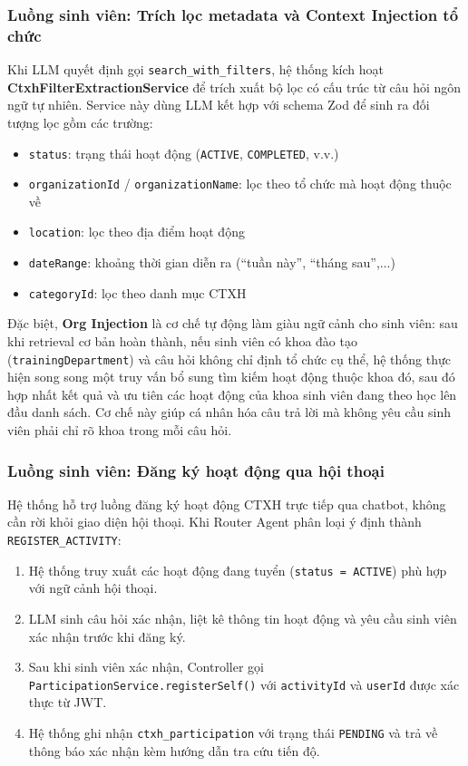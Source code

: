 \subsubsection{Luồng sinh viên: Trích lọc metadata và Context Injection tổ chức}
Khi LLM quyết định gọi \texttt{search\_with\_filters}, hệ thống kích hoạt \textbf{CtxhFilterExtractionService} để trích xuất bộ lọc có cấu trúc từ câu hỏi ngôn ngữ tự nhiên. Service này dùng LLM kết hợp với schema Zod để sinh ra đối tượng lọc gồm các trường:
\begin{itemize}
	\item \texttt{status}: trạng thái hoạt động (\texttt{ACTIVE}, \texttt{COMPLETED}, v.v.)
	\item \texttt{organizationId} / \texttt{organizationName}: lọc theo tổ chức mà hoạt động thuộc về
	\item \texttt{location}: lọc theo địa điểm hoạt động
	\item \texttt{dateRange}: khoảng thời gian diễn ra (``tuần này'', ``tháng sau'',...)
	\item \texttt{categoryId}: lọc theo danh mục CTXH
\end{itemize}

Đặc biệt, \textbf{Org Injection} là cơ chế tự động làm giàu ngữ cảnh cho sinh viên: sau khi retrieval cơ bản hoàn thành, nếu sinh viên có khoa đào tạo (\texttt{trainingDepartment}) và câu hỏi không chỉ định tổ chức cụ thể, hệ thống thực hiện song song một truy vấn bổ sung tìm kiếm hoạt động thuộc khoa đó, sau đó hợp nhất kết quả và ưu tiên các hoạt động của khoa sinh viên đang theo học lên đầu danh sách. Cơ chế này giúp cá nhân hóa câu trả lời mà không yêu cầu sinh viên phải chỉ rõ khoa trong mỗi câu hỏi.

\subsubsection{Luồng sinh viên: Đăng ký hoạt động qua hội thoại}
Hệ thống hỗ trợ luồng đăng ký hoạt động CTXH trực tiếp qua chatbot, không cần rời khỏi giao diện hội thoại. Khi Router Agent phân loại ý định thành \texttt{REGISTER\_ACTIVITY}:

\begin{enumerate}
	\item Hệ thống truy xuất các hoạt động đang tuyển (\texttt{status = ACTIVE}) phù hợp với ngữ cảnh hội thoại.
	\item LLM sinh câu hỏi xác nhận, liệt kê thông tin hoạt động và yêu cầu sinh viên xác nhận trước khi đăng ký.
	\item Sau khi sinh viên xác nhận, Controller gọi \texttt{ParticipationService.registerSelf()} với \texttt{activityId} và \texttt{userId} được xác thực từ JWT.
	\item Hệ thống ghi nhận \texttt{ctxh\_participation} với trạng thái \texttt{PENDING} và trả về thông báo xác nhận kèm hướng dẫn tra cứu tiến độ.
\end{enumerate}

